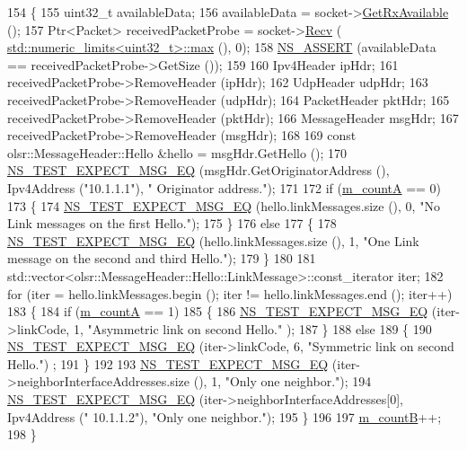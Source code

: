 \begin{DoxyCode}
154 \{
155   uint32\_t availableData;
156   availableData = socket->\hyperlink{classns3_1_1Socket_ad35d8931e53ae0754ee864acb1cecd0e}{GetRxAvailable} ();
157   Ptr<Packet> receivedPacketProbe = socket->\hyperlink{classns3_1_1Socket_a8949b1f844aae563446f2f4c5be8827a}{Recv} (
      \hyperlink{80211b_8c_affe776513b24d84b39af8ab0930fef7f}{std::numeric\_limits<uint32\_t>::max} (), 0);
158   \hyperlink{assert_8h_a6dccdb0de9b252f60088ce281c49d052}{NS\_ASSERT} (availableData == receivedPacketProbe->GetSize ());
159 
160   Ipv4Header ipHdr;
161   receivedPacketProbe->RemoveHeader (ipHdr);
162   UdpHeader udpHdr;
163   receivedPacketProbe->RemoveHeader (udpHdr);
164   PacketHeader pktHdr;
165   receivedPacketProbe->RemoveHeader (pktHdr);
166   MessageHeader msgHdr;
167   receivedPacketProbe->RemoveHeader (msgHdr);
168 
169   \textcolor{keyword}{const} olsr::MessageHeader::Hello &hello = msgHdr.GetHello ();
170   \hyperlink{group__testing_ga7304ba46a28d8cf08dfdfd6499cf7068}{NS\_TEST\_EXPECT\_MSG\_EQ} (msgHdr.GetOriginatorAddress (), Ipv4Address (\textcolor{stringliteral}{"10.1.1.1"}), \textcolor{stringliteral}{"
      Originator address."});
171 
172   \textcolor{keywordflow}{if} (\hyperlink{classns3_1_1olsr_1_1HelloRegressionTest_a89b07fe86d41662bf3ef877f244d333c}{m\_countA} == 0)
173     \{
174       \hyperlink{group__testing_ga7304ba46a28d8cf08dfdfd6499cf7068}{NS\_TEST\_EXPECT\_MSG\_EQ} (hello.linkMessages.size (), 0, \textcolor{stringliteral}{"No Link messages on the
       first Hello."});
175     \}
176   \textcolor{keywordflow}{else}
177     \{
178       \hyperlink{group__testing_ga7304ba46a28d8cf08dfdfd6499cf7068}{NS\_TEST\_EXPECT\_MSG\_EQ} (hello.linkMessages.size (), 1, \textcolor{stringliteral}{"One Link message on the
       second and third Hello."});
179     \}
180 
181   std::vector<olsr::MessageHeader::Hello::LinkMessage>::const\_iterator iter;
182   \textcolor{keywordflow}{for} (iter = hello.linkMessages.begin (); iter != hello.linkMessages.end (); iter++)
183     \{
184       \textcolor{keywordflow}{if} (\hyperlink{classns3_1_1olsr_1_1HelloRegressionTest_a89b07fe86d41662bf3ef877f244d333c}{m\_countA} == 1)
185         \{
186           \hyperlink{group__testing_ga7304ba46a28d8cf08dfdfd6499cf7068}{NS\_TEST\_EXPECT\_MSG\_EQ} (iter->linkCode, 1, \textcolor{stringliteral}{"Asymmetric link on second Hello."}
      );
187         \}
188       \textcolor{keywordflow}{else}
189         \{
190           \hyperlink{group__testing_ga7304ba46a28d8cf08dfdfd6499cf7068}{NS\_TEST\_EXPECT\_MSG\_EQ} (iter->linkCode, 6, \textcolor{stringliteral}{"Symmetric link on second Hello."})
      ;
191         \}
192 
193       \hyperlink{group__testing_ga7304ba46a28d8cf08dfdfd6499cf7068}{NS\_TEST\_EXPECT\_MSG\_EQ} (iter->neighborInterfaceAddresses.size (), 1, \textcolor{stringliteral}{"Only one
       neighbor."});
194       \hyperlink{group__testing_ga7304ba46a28d8cf08dfdfd6499cf7068}{NS\_TEST\_EXPECT\_MSG\_EQ} (iter->neighborInterfaceAddresses[0], Ipv4Address (\textcolor{stringliteral}{"
      10.1.1.2"}), \textcolor{stringliteral}{"Only one neighbor."});
195     \}
196 
197   \hyperlink{classns3_1_1olsr_1_1HelloRegressionTest_aa3b0da1aed971f58de9e95663bd0b8e0}{m\_countB}++;
198 \}
\end{DoxyCode}


